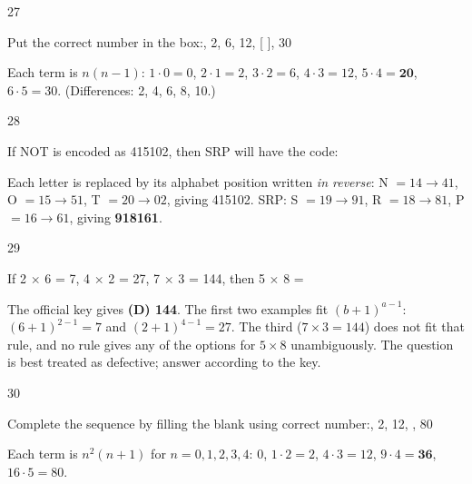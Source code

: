 \begin{question}{27}
{Put the correct number in the box:, 2, 6, 12, [ ], 30\par}
\begin{explain}
Each term is $n(n-1)$: $1\cdot0=0$, $2\cdot1=2$, $3\cdot2=6$, $4\cdot3=12$, $5\cdot4=\mathbf{20}$, $6\cdot5=30$. (Differences: 2, 4, 6, 8, 10.)
\end{explain}
\end{question}

\begin{question}{28}
{If NOT is encoded as 415102, then SRP will have the code:\par}
\begin{explain}
Each letter is replaced by its alphabet position written \emph{in reverse}: N $=14\rightarrow41$, O $=15\rightarrow51$, T $=20\rightarrow02$, giving 415102.
SRP: S $=19\rightarrow91$, R $=18\rightarrow81$, P $=16\rightarrow61$, giving \textbf{918161}.
\end{explain}
\end{question}

\begin{question}{29}
{If 2 $\times$ 6 = 7, 4 $\times$ 2 = 27, 7 $\times$ 3 = 144, then 5 $\times$ 8 = \blank{}\par}
\begin{explain}
The official key gives \textbf{(D) 144}. The first two examples fit $(b+1)^{a-1}$: $(6+1)^{2-1}=7$ and $(2+1)^{4-1}=27$. The third ($7\times3=144$) does not fit that rule, and no rule gives any of the options for $5\times8$ unambiguously. The question is best treated as defective; answer according to the key.
\end{explain}
\end{question}

\begin{question}{30}
{Complete the sequence by filling the blank using correct number:, 2, 12, \blank{}, 80\par}
\begin{explain}
Each term is $n^2(n+1)$ for $n=0,1,2,3,4$: $0$, $1\cdot2=2$, $4\cdot3=12$, $9\cdot4=\mathbf{36}$, $16\cdot5=80$.
\end{explain}
\end{question}

